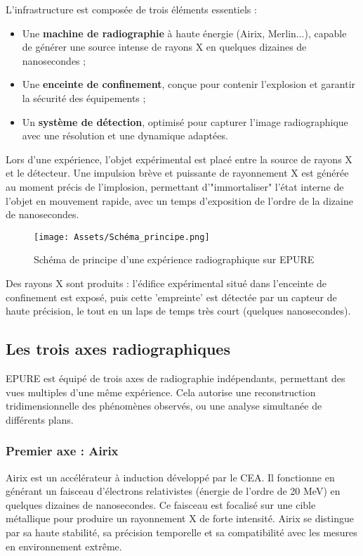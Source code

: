 \documentclass[12pt,a4paper]{report}
\begin{document}
L’infrastructure est composée de trois éléments essentiels :
\begin{itemize}
\item Une \textbf{machine de radiographie} à haute énergie (Airix, Merlin...), capable de générer une source intense de rayons X en quelques dizaines de nanosecondes ;
\item Une \textbf{enceinte de confinement}, conçue pour contenir l’explosion et garantir la sécurité des équipements ;
\item Un \textbf{système de détection}, optimisé pour capturer l’image radiographique avec une résolution et une dynamique adaptées.
\end{itemize}

Lors d’une expérience, l’objet expérimental est placé entre la source de rayons X et le détecteur. Une impulsion brève et puissante de rayonnement X est générée au moment précis de l’implosion, permettant d’"immortaliser" l’état interne de l’objet en mouvement rapide, avec un temps d’exposition de l’ordre de la dizaine de nanosecondes.

\begin{figure}[H]
    \centering
    \texttt{[image: Assets/Schéma\_principe.png]}
    \caption{Schéma de principe d’une expérience radiographique sur EPURE}
    \label{fig:images}
\end{figure}

Des rayons X sont produits : l’édifice expérimental situé dans l’enceinte de confinement est exposé, puis cette 'empreinte' est détectée par un capteur de haute précision, le tout en un laps de temps très court (quelques nanosecondes).

\subsection{Les trois axes radiographiques}
EPURE est équipé de trois axes de radiographie indépendants, permettant des vues multiples d’une même expérience. Cela autorise une reconstruction tridimensionnelle des phénomènes observés, ou une analyse simultanée de différents plans.
\subsubsection{Premier axe : Airix}
Airix est un accélérateur à induction développé par le CEA. Il fonctionne en générant un faisceau d’électrons relativistes (énergie de l’ordre de 20 MeV) en quelques dizaines de nanosecondes. Ce faisceau est focalisé sur une cible métallique pour produire un rayonnement X de forte intensité. Airix se distingue par sa haute stabilité, sa précision temporelle et sa compatibilité avec les mesures en environnement extrême.
\end{document}
